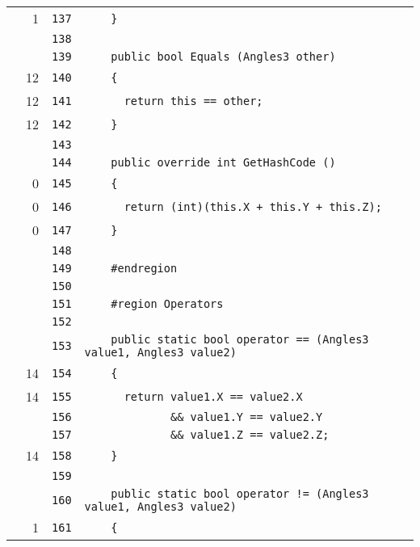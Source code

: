 \documentclass[a4paper,10pt]{article}
\begin{document}
\begin{longtable}[l]{lrrl}
\cellcolor{green} & 1 & \verb~137~ & \verb~    }~\\
\cellcolor{gray} &  & \verb~138~ & \verb~~\\
\cellcolor{gray} &  & \verb~139~ & \verb~    public bool Equals (Angles3 other)~\\
\cellcolor{green} & 12 & \verb~140~ & \verb~    {~\\
\cellcolor{green} & 12 & \verb~141~ & \verb~      return this == other;~\\
\cellcolor{green} & 12 & \verb~142~ & \verb~    }~\\
\cellcolor{gray} &  & \verb~143~ & \verb~~\\
\cellcolor{gray} &  & \verb~144~ & \verb~    public override int GetHashCode ()~\\
\cellcolor{red} & 0 & \verb~145~ & \verb~    {~\\
\cellcolor{red} & 0 & \verb~146~ & \verb~      return (int)(this.X + this.Y + this.Z);~\\
\cellcolor{red} & 0 & \verb~147~ & \verb~    }~\\
\cellcolor{gray} &  & \verb~148~ & \verb~~\\
\cellcolor{gray} &  & \verb~149~ & \verb~    #endregion~\\
\cellcolor{gray} &  & \verb~150~ & \verb~~\\
\cellcolor{gray} &  & \verb~151~ & \verb~    #region Operators~\\
\cellcolor{gray} &  & \verb~152~ & \verb~~\\
\cellcolor{gray} &  & \verb~153~ & \verb~    public static bool operator == (Angles3 value1, Angles3 value2)~\\
\cellcolor{green} & 14 & \verb~154~ & \verb~    {~\\
\cellcolor{green} & 14 & \verb~155~ & \verb~      return value1.X == value2.X~\\
\cellcolor{gray} &  & \verb~156~ & \verb~             && value1.Y == value2.Y~\\
\cellcolor{gray} &  & \verb~157~ & \verb~             && value1.Z == value2.Z;~\\
\cellcolor{green} & 14 & \verb~158~ & \verb~    }~\\
\cellcolor{gray} &  & \verb~159~ & \verb~~\\
\cellcolor{gray} &  & \verb~160~ & \verb~    public static bool operator != (Angles3 value1, Angles3 value2)~\\
\cellcolor{green} & 1 & \verb~161~ & \verb~    {~\\

\end{longtable}
\end{document}
